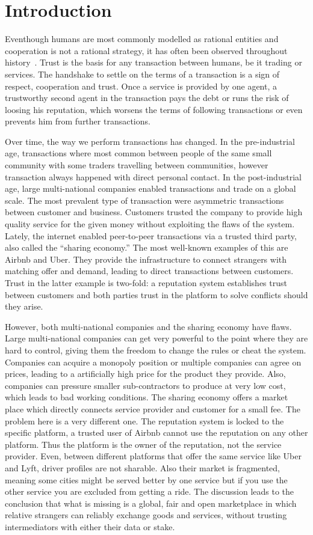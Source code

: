\chapter{Introduction}
Eventhough humans are most commonly modelled as rational entities and cooperation
is not a rational strategy, it has often been observed throughout history~\cite{Axelrod1390}.
Trust is the basis for any transaction between humans, be it trading or services. 
The handshake to settle on the terms 
of a transaction is a sign of respect, cooperation and trust. Once a service is
provided by one agent, a trustworthy second agent in the transaction pays the debt 
or runs the risk of loosing his reputation, which worsens the terms of following 
transactions or even prevents him from further transactions.

Over time, the way we perform transactions has changed. In the pre-industrial age,
transactions where most common between people of the same small community with some traders
travelling between communities, however transaction always happened with direct 
personal contact. In the post-industrial age, large multi-national companies enabled transactions
and trade on a global scale. The most prevalent type of transaction were asymmetric transactions between
customer and business. Customers trusted the company to provide high quality service 
for the given money without exploiting the flaws of the system. Lately, the internet enabled
peer-to-peer transactions via a trusted third party, also called the ``sharing economy.''
The most well-known examples of this are Airbnb and Uber. They provide the infrastructure to connect strangers with 
matching offer and demand, leading to direct transactions between customers. Trust in the latter
example is two-fold: a reputation system establishes trust between customers and both
parties trust in the platform to solve conflicts should they arise.

However, both multi-national companies and the sharing economy have flaws. Large multi-national
companies can get very powerful to the point where they are hard to control, giving them
the freedom to change the rules or cheat the system. Companies can acquire a monopoly 
position or multiple companies can agree on prices, leading to a artificially high price
for the product they provide. Also, companies can pressure smaller sub-contractors to 
produce at very low cost, which leads to bad working conditions. The sharing economy offers
a market place which directly connects service provider and customer for a small fee. The
problem here is a very different one. The reputation system is locked to the specific platform, 
a trusted user of Airbnb cannot use the reputation on any other platform. Thus the platform 
is the owner of the reputation, not the service provider. Even, between different platforms
that offer the same service like Uber and Lyft, driver profiles are not sharable. Also their
market is fragmented, meaning some cities might be served better by one service but if you
use the other service you are excluded from getting a ride. The discussion leads to the 
conclusion that what is missing is a global, fair and open marketplace 
in which relative strangers can reliably exchange goods and services, without trusting 
intermediators with either their data or stake. 

